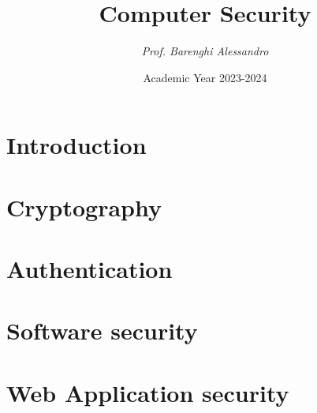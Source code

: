 \documentclass[12pt, a4paper]{report}
\title{\textbf{Computer Security}}
\author{\textit{Prof. Barenghi Alessandro}}
\date{Academic Year 2023-2024}
\begin{document}
    \maketitle

    

    \cleardoublepage{}

    \tableofcontents

    \cleardoublepage{}

    \chapter{Introduction}
    
    
    

    \chapter{Cryptography}
    
    
    
    
    
    
    
    
    
    

    \chapter{Authentication}
    
    
    
    
    

    \chapter{Software security}
    
    
    
    

    \chapter{Web Application security}
    
    
    
    
    
\end{document}
